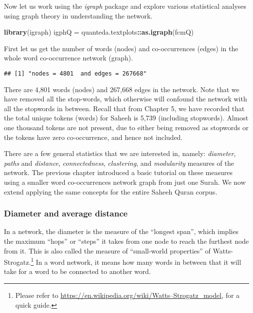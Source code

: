 \documentclass[
]{article}
\newenvironment{Shaded}{\begin{snugshade}}{\end{snugshade}}
\newcommand{\FunctionTok}[1]{\textcolor[rgb]{0.13,0.29,0.53}{\textbf{#1}}}
\newcommand{\NormalTok}[1]{#1}
\newcommand{\OtherTok}[1]{\textcolor[rgb]{0.56,0.35,0.01}{#1}}
\newcommand{\SpecialCharTok}[1]{\textcolor[rgb]{0.81,0.36,0.00}{\textbf{#1}}}
\begin{document}
Now let us work using the \emph{igraph} package and explore various statistical analyses using graph theory in understanding the network.

\footnotesize

\begin{Shaded}
\begin{Highlighting}[]
\FunctionTok{library}\NormalTok{(igraph)}
\NormalTok{igphQ }\OtherTok{=}\NormalTok{ quanteda.textplots}\SpecialCharTok{::}\FunctionTok{as.igraph}\NormalTok{(fcmQ)}
\end{Highlighting}
\end{Shaded}

\normalsize

First let us get the number of words (nodes) and co-occurrences (edges) in the whole word co-occurrence network (graph).

\footnotesize

\begin{verbatim}
## [1] "nodes = 4801  and edges = 267668"
\end{verbatim}

\normalsize

There are 4,801 words (nodes) and 267,668 edges in the network. Note that we have removed all the stop-words, which otherwise will confound the network with all the stopwords in between. Recall that from Chapter 5, we have recorded that the total unique tokens (words) for Saheeh is 5,739 (including stopwords). Almost one thousand tokens are not present, due to either being removed as stopwords or the tokens have zero co-occurrence, and hence not included.

There are a few general statistics that we are interested in, namely: \emph{diameter}, \emph{paths} and \emph{distance}, \emph{connectedness}, \emph{clustering}, and \emph{modularity} measures of the network. The previous chapter introduced a basic tutorial on these measures using a smaller word co-occurrences network graph from just one Surah. We now extend applying the same concepts for the entire Saheeh Quran corpus.

\hypertarget{diameter-and-average-distance}{%
\subsubsection{Diameter and average distance}\label{diameter-and-average-distance}}

In a network, the diameter is the measure of the ``longest span'', which implies the maximum ``hops'' or ``steps'' it takes from one node to reach the furthest node from it. This is also called the measure of ``small-world properties'' of Watts-Strogatz.\footnote{Please refer to \url{https://en.wikipedia.org/wiki/Watts–Strogatz_model}, for a quick guide.} In a word network, it means how many words in between that it will take for a word to be connected to another word.
\end{document}
